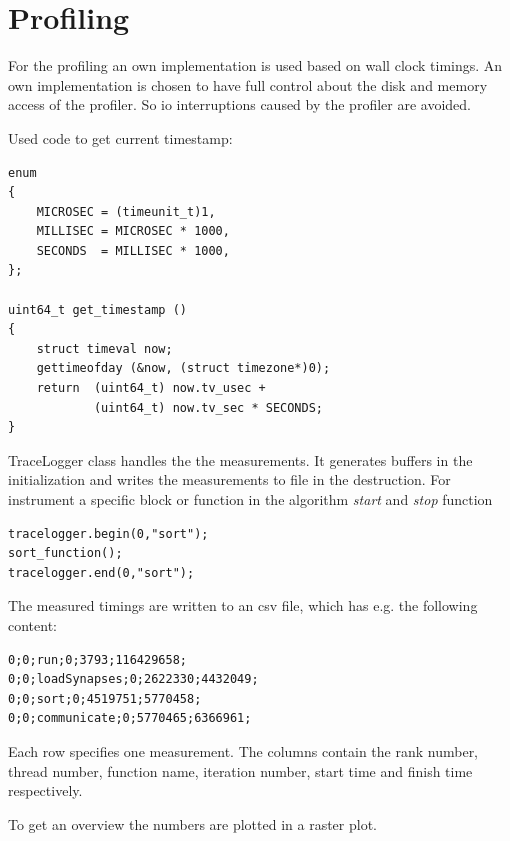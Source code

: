 %

\chapter{Profiling}

For the profiling an own implementation is used based on wall clock timings.
An own implementation is
chosen to have full control about the disk and memory access of the profiler.
So io interruptions caused by the profiler are avoided.

Used code to get current timestamp:

\begin{lstlisting}
enum
{
	MICROSEC = (timeunit_t)1,
	MILLISEC = MICROSEC * 1000,
	SECONDS  = MILLISEC * 1000,
};

uint64_t get_timestamp ()
{
    struct timeval now;
    gettimeofday (&now, (struct timezone*)0);
    return  (uint64_t) now.tv_usec + 
            (uint64_t) now.tv_sec * SECONDS;
}
\end{lstlisting}

TraceLogger class handles the the measurements.
It generates buffers in the initialization and writes the measurements to file in the destruction.
For instrument a specific block or function in the algorithm \emph{start} and \emph{stop} function
\begin{lstlisting}
tracelogger.begin(0,"sort");
sort_function();
tracelogger.end(0,"sort");
\end{lstlisting}

The measured timings are written to an csv file, which has e.g. the following content:
\begin{lstlisting}
0;0;run;0;3793;116429658;
0;0;loadSynapses;0;2622330;4432049;
0;0;sort;0;4519751;5770458;
0;0;communicate;0;5770465;6366961;
\end{lstlisting}


Each row specifies one measurement. The columns contain the rank number, thread number, function name,
iteration number, start time and finish time respectively.

To get an overview the numbers are plotted in a raster plot.

